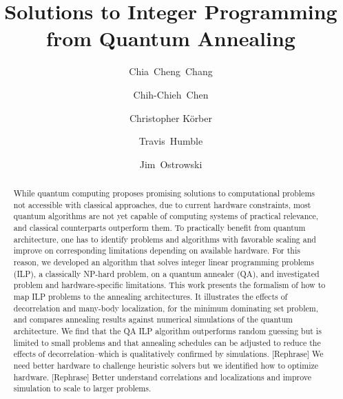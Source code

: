 \documentclass[prd,twocolumn,tightenlines,preprintnumbers,showpacs,superscriptaddress,notitlepage,nofootinbib,eqsecnum,floatfix,longbibliography]{revtex4}
\begin{document}
\title{Solutions to Integer Programming from Quantum Annealing}

\author{Chia~Cheng~Chang}
\author{Chih-Chieh~Chen}
\author{Christopher K\"orber}
\author{Travis~Humble}
\author{Jim~Ostrowski}

\newcommand{\alert}[1]{\textbf{\color{red}{#1}}}
\renewcommand{\vec}[1]{\boldsymbol{#1}}

\begin{abstract}
While quantum computing proposes promising solutions to computational problems not accessible with classical approaches, due to current hardware constraints, most quantum algorithms are not yet capable of computing systems of practical relevance, and classical counterparts outperform them.
To practically benefit from quantum architecture, one has to identify problems and algorithms with favorable scaling and improve on corresponding limitations depending on available hardware.
For this reason, we developed an algorithm that solves integer linear programming problems (ILP), a classically NP-hard problem, on a quantum annealer (QA), and investigated problem and hardware-specific limitations.
This work presents the formalism of how to map ILP problems to the annealing architectures.
It illustrates the effects of decorrelation and many-body localization, for the minimum dominating set problem, and compares annealing results against numerical simulations of the quantum architecture.
We find that the QA ILP algorithm outperforms random guessing but is limited to small problems and that annealing schedules can be adjusted to reduce the effects of decorrelation--which is qualitatively confirmed by simulations.
[Rephrase] We need better hardware to challenge heuristic solvers but we identified how to optimize hardware.
[Rephrase] Better understand correlations and localizations and improve simulation to scale to larger problems.

\end{abstract}
\end{document}
